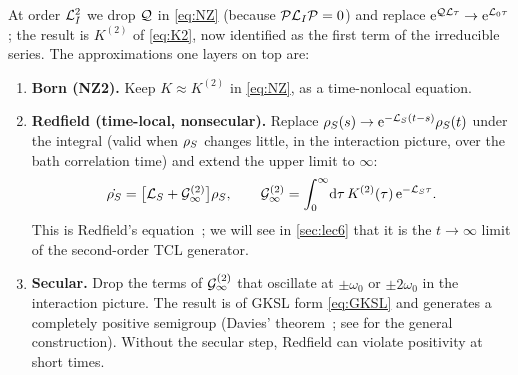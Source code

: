 At order $\mathcal{L}_I^2$ we drop $\mathcal{Q}$ in \cref{eq:NZ} (because $\mathcal{P}\mathcal{L}_I\mathcal{P}=0$) and replace $\mathrm{e}^{\mathcal{Q}\mathcal{L}\tau}\to\mathrm{e}^{\mathcal{L}_0\tau}$; the result is $K^{(2)}$ of \cref{eq:K2}, now identified as the first term of the irreducible series.
The approximations one layers on top are:
\begin{enumerate}[itemsep=1pt]
\item \textbf{Born (NZ2).}
  Keep $K\approx K^{(2)}$ in \cref{eq:NZ}, as a time-nonlocal equation.
\item \textbf{Redfield (time-local, nonsecular).}
  Replace $\rho_{S}(s)\to\mathrm{e}^{-\mathcal{L}_S(t-s)}\rho_{S}(t)$ under the integral (valid when $\rho_{S}$ changes little, in the interaction picture, over the bath correlation time) and extend the upper limit to $\infty$:
  \begin{equation}
    \dot{\rho_{S}}=\big[\mathcal{L}_S+\mathcal{G}^{(2)}_\infty\big]\rho_{S},\qquad
    \mathcal{G}^{(2)}_\infty=\int_0^\infty\!\mathrm{d}\tau\,K^{(2)}(\tau)\,\mathrm{e}^{-\mathcal{L}_S\tau}.
    \label{eq:redfield}
  \end{equation}
This is Redfield's equation~\cite{Redfield1957,WangsnessBloch1953,Bloch1957}; we will see in \cref{sec:lec6} that it is the $t\to\infty$ limit of the second-order TCL generator.
\item \textbf{Secular.}
  Drop the terms of $\mathcal{G}^{(2)}_\infty$ that oscillate at $\pm\omega_0$ or $\pm2\omega_0$ in the interaction picture.
  The result is of GKSL form \eqref{eq:GKSL} and generates a completely positive semigroup (Davies' theorem~\cite{Davies1974}; see \cite[Sec.~3.3.1]{BreuerPetruccione} for the general construction).
  Without the secular step, Redfield can violate positivity at short times.
\end{enumerate}

